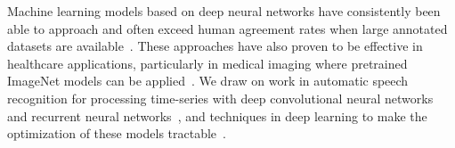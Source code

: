 Machine learning models based on deep neural networks have consistently been
able to approach and often exceed human agreement rates when large annotated
datasets are available~\cite{amodei2016deep, xiong2016achieving,he2015delving}.
These approaches have also proven to be effective in healthcare applications,
particularly in medical imaging where pretrained ImageNet models can be
applied~\cite{esteva2017dermatologist, gulshan2016development}. We draw on work
in automatic speech recognition for processing time-series with deep
convolutional neural networks and recurrent neural
networks~\cite{hannun2014deepspeech, sainath2013deep}, and techniques in deep
learning to make the optimization of these models tractable~\cite{he2016deep,
he2016identity, ioffe2015batch}.
